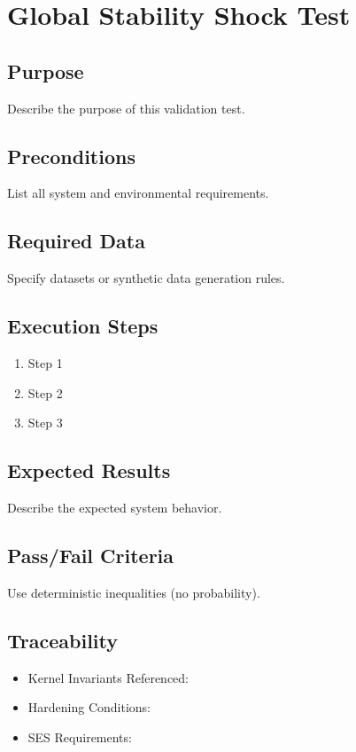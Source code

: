 

\section*{Global Stability Shock Test}

\subsection*{Purpose}
Describe the purpose of this validation test.

\subsection*{Preconditions}
List all system and environmental requirements.

\subsection*{Required Data}
Specify datasets or synthetic data generation rules.

\subsection*{Execution Steps}
\begin{enumerate}
    \item Step 1
    \item Step 2
    \item Step 3
\end{enumerate}

\subsection*{Expected Results}
Describe the expected system behavior.

\subsection*{Pass/Fail Criteria}
Use deterministic inequalities (no probability).

\subsection*{Traceability}
\begin{itemize}
    \item Kernel Invariants Referenced:
    \item Hardening Conditions:
    \item SES Requirements:
\end{itemize}
